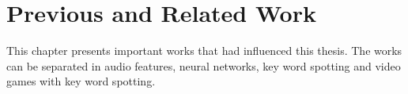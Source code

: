 
\chapter{Previous and Related Work}\label{sec:prev}
This chapter presents important works that had influenced this thesis.
The works can be separated in audio features, neural networks, key word spotting and video games with key word spotting.












